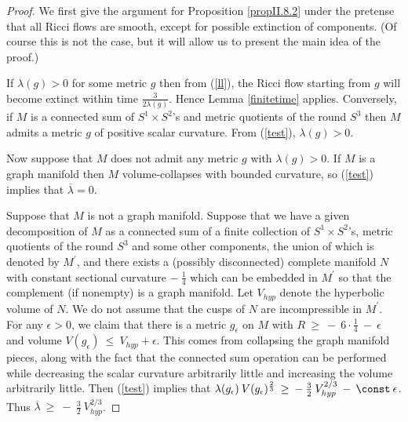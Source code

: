 \begin{proof}
We first give the argument for Proposition \ref{propII.8.2} under the
pretense that all Ricci flows are smooth, except for possible
extinction of components. (Of course this is not the
case, but it will allow us to present the main idea of the proof.)

If $\lambda(g) > 0$ for some metric $g$ then from (\ref{ll}), the Ricci flow
starting from $g$ will become extinct within time
$\frac{3}{2\lambda(g)}$. Hence Lemma \ref{finitetime} applies.
Conversely, if $M$ is a connected sum of $S^1 \times S^2$'s and
metric quotients of the round $S^3$ then $M$ admits a metric $g$ of
positive scalar curvature.  From (\ref{test}), $\lambda(g) > 0$.

Now suppose that $M$ does
not admit any metric $g$ with $\lambda(g) > 0$.
If $M$ is a graph manifold then $M$ volume-collapses with bounded
curvature, so (\ref{test}) implies that $\overline{\lambda} = 0$.

Suppose that $M$ is not a graph manifold. Suppose that we have
a given decomposition of $M$
as a connected sum
of a finite collection of $S^1 \times S^2$'s, metric quotients of the round
$S^3$ and some other components, the union of which is denoted by
$M^\prime$, and there exists a (possibly disconnected) complete
manifold $N$ with constant sectional curvature $- \: \frac14$
which can be embedded in $M^\prime$ so that the
complement (if nonempty) is a graph manifold.
Let
$V_{hyp}$ denote the hyperbolic volume of $N$.  We do not
assume that the cusps of $N$ are incompressible in $M^\prime$.
For any $\epsilon > 0$, we claim that
there is a metric $g_\epsilon$ on $M$ with
$R \: \ge \: - \: 6 \cdot \frac14 \: - \: \epsilon$ and volume
$V(g_\epsilon) \: \le \: V_{hyp} + \epsilon$. This comes from
collapsing the graph manifold pieces, along with the
fact that the connected sum operation can be performed
while  decreasing the scalar curvature arbitrarily little and increasing
the volume arbitrarily little.
Then (\ref{test}) implies that
$\lambda(g_\epsilon) \: V(g_\epsilon)^{\frac23}
 \: \ge \: - \: \frac32 \: V_{hyp}^{2/3} \: - \: \const \:
\epsilon$. Thus
$\overline{\lambda} \: \ge \:
- \: \frac32 \: V_{hyp}^{2/3}$.


\end{proof}
